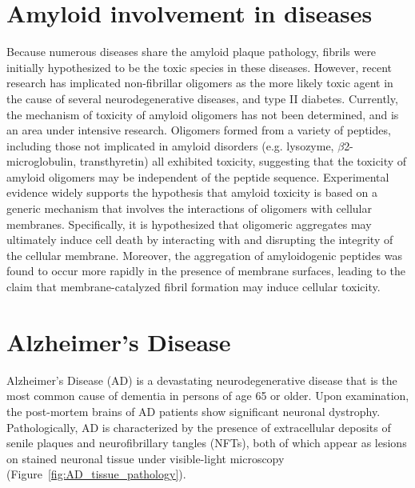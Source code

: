 \section{Amyloid involvement in diseases}

Because numerous diseases share the amyloid plaque pathology, fibrils were initially hypothesized to be the toxic species in these diseases.\cite{Hardy:2002dh} However, recent research has implicated non-fibrillar oligomers as the more likely toxic agent in the cause of several neurodegenerative diseases, and type II diabetes.\cite{Haass:2007db,Xue:2009da,Berthelot:2013fs} %
Currently, the mechanism of toxicity of amyloid oligomers has not been determined, and is an area under intensive research.  Oligomers formed from a variety of peptides, including those not implicated in amyloid disorders (e.g. lysozyme, $\beta$2-microglobulin, transthyretin) all exhibited toxicity, suggesting that the toxicity of amyloid oligomers may be independent of the peptide sequence.\cite{Fandrich:2012kb,Kayed:2003en} Experimental evidence widely supports the hypothesis that amyloid toxicity is based on a generic mechanism that involves the interactions of oligomers with cellular membranes.\cite{Martins:2008bz,Walsh:2007fu} Specifically, it is hypothesized that oligomeric aggregates may ultimately induce cell death by interacting with and disrupting the integrity of the cellular membrane.\cite{Fandrich:2012kb} Moreover, the aggregation of amyloidogenic peptides was found to occur more rapidly in the presence of membrane surfaces,\cite{McLaurin:1997wm,Kayed:2004ul,Yip:2002vx} leading to the claim that membrane-catalyzed fibril formation may induce cellular toxicity.\cite{Yip:2001tl}


\section{Alzheimer's Disease}
Alzheimer's Disease (AD) is a devastating neurodegenerative disease that is the most common cause of dementia in persons of age 65 or older. Upon examination, the post-mortem brains of AD patients show significant neuronal dystrophy. Pathologically, AD is characterized by the presence of extracellular deposits of senile plaques and neurofibrillary tangles (NFTs), both of which appear as lesions on stained neuronal tissue under visible-light microscopy (Figure~\ref{fig:AD_tissue_pathology}).

